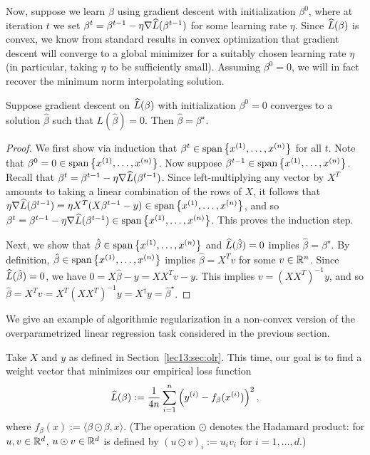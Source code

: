 Now, suppose we learn $\beta$ using gradient descent with initialization $\beta^0$, where at iteration $t$ we set $\beta^t = \beta^{t-1} - \eta \nabla \widehat{L}(\beta^{t-1})$ for some learning rate $\eta$. Since $\widehat{L} (\beta)$ is convex, we know from standard results in convex optimization that gradient descent will converge to a global minimizer for a suitably chosen learning rate $\eta$ (in particular, taking $\eta$ to be sufficiently small). Assuming $\beta^0 = 0$, we will in fact recover the minimum norm interpolating solution.
\begin{theorem}
Suppose gradient descent on $\widehat{L}(\beta)$ with initialization $\beta^0 = 0$ converges to a solution $\hat \beta$ such that $L(\hat \beta) = 0$. Then $\hat \beta = \beta^\star$.
\end{theorem}
\begin{proof}
We first show via induction that $\beta^t \in \text{span}\left\{ x^{(1)}, \dots,x^{(n)} \right\}$ for all $t$. Note that $\beta^0 = 0 \in \text{span}\left\{ x^{(1)}, \dots,x^{(n)} \right\}$. Now suppose $\beta^{t-1} \in \text{span}\left\{ x^{(1)}, \dots,x^{(n)} \right\}$. Recall that $\beta^t = \beta^{t-1} - \eta \nabla \widehat{L}(\beta^{t-1})$. Since left-multiplying any vector by $X^T$ amounts to taking a linear combination of the rows of $X$, it follows that $\eta \nabla \widehat{L}(\beta^{t-1}) = \eta X^T(X\beta^{t-1} - y) \in \text{span}\left\{ x^{(1)}, \dots,x^{(n)} \right\}$, and so $\beta^t = \beta^{t-1} - \eta \nabla \widehat{L}(\beta^{t-1}) \in \text{span}\left\{ x^{(1)}, \dots,x^{(n)} \right\}$. This proves the induction step.

Next, we show that $\hat \beta \in \text{span}\left\{ x^{(1)}, \dots,x^{(n)} \right\}$ and $\widehat{L}(\hat \beta) = 0$ implies $\hat \beta = \beta^\star$. By definition, $\hat \beta \in \text{span}\left\{ x^{(1)}, \dots,x^{(n)} \right\}$ implies $\hat \beta = X^T v$ for some $v \in \mathbb R^n$. Since $\widehat{L}(\hat \beta) = 0$, we have $0 = X\hat \beta - y = X X^T v - y$. This implies $v = (X X^T)^{-1}y$, and so $\hat \beta = X^T v = X^T (X X^T)^{-1} y = X^\dagger y = \hat \beta^\star$.
\end{proof}

We give an example of algorithmic regularization in a non-convex version of the overparametrized linear regression task considered in the previous section.

Take $X$ and $y$ as defined in Section~\ref{lec13:sec:olr}. This time, our goal is to find a weight vector that minimizes our empirical loss function
\begin{equation}
\widehat{L}(\beta) := \frac{1}{4n}\sum_{i=1}^n \left(y^{(i)} - f_\beta(x^{(i)})\right)^2,
\end{equation}
where $f_\beta(x):= \langle \beta \odot \beta, x\rangle$. (The operation $\odot$ denotes the Hadamard product: for $u,v \in \mathbb R^d$, $u \odot v \in \mathbb R^d$ is defined by $(u \odot v)_i := u_i v_i$ for $i = 1, \dots, d$.)

